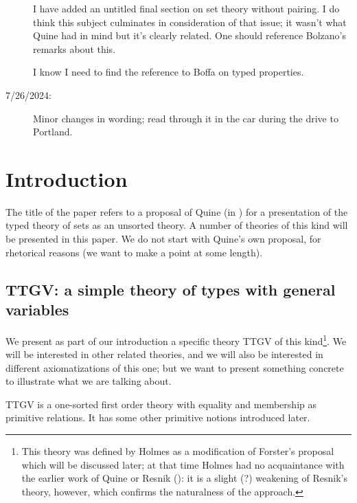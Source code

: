 \documentclass[12pt]{article}
\begin{document}
\begin{description}
I have added an untitled final section on set theory without pairing.  I do think this subject culminates in consideration of that issue;  it wasn't what Quine had in mind but it's clearly related.  One should reference Bolzano's remarks about this.

I know I need to find the reference to Boffa on typed properties.

\item[7/26/2024:]  Minor changes in wording;  read through it in the car during the drive to Portland.

\end{description}

\newpage

\section{Introduction}

The title of the paper refers to a proposal of Quine (in
\cite{quiettgv}) for a presentation of the typed theory of sets as an
unsorted theory.  A number of theories of this kind will be presented
in this paper.  We do not start with Quine's own proposal, for
rhetorical reasons (we want to make a point at some length).

\subsection{TTGV:  a simple theory of types with general variables}

We present as part of our introduction a specific theory TTGV of this
kind\footnote{This theory was defined by Holmes as a modification of Forster's proposal which will be discussed later; at that time Holmes had no acquaintance with the earlier work of Quine or Resnik (\cite{resnikttgv}):  it is a slight (?) weakening of Resnik's theory, however, which confirms the naturalness of the approach.}.  We will be interested in other related theories, and we will
also be interested in different axiomatizations of this one; but we
want to present something concrete to illustrate what we are talking
about.

TTGV is a one-sorted first order theory with equality and membership as primitive relations.  It has some other primitive notions introduced later.
\end{document}
